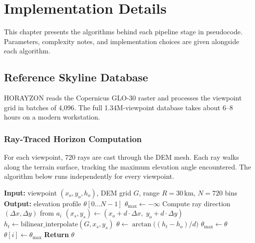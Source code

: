 \chapter{Implementation Details}
\label{chap:implementation}

This chapter presents the algorithms behind each pipeline stage in pseudocode. Parameters, complexity notes, and implementation choices are given alongside each algorithm.

\section{Reference Skyline Database}

HORAYZON reads the Copernicus GLO-30 raster and processes the viewpoint grid in batches of 4{,}096. The full 1.34M-viewpoint database takes about 6--8 hours on a modern workstation.

\subsection{Ray-Traced Horizon Computation}

For each viewpoint, 720 rays are cast through the DEM mesh. Each ray walks along the terrain surface, tracking the maximum elevation angle encountered. The algorithm below runs independently for every viewpoint.

\begin{algorithm}[H]
\caption{Ray-Traced Horizon}
\label{alg:raytrace}
\begin{algorithmic}[1]
\State \textbf{Input:} viewpoint $(x_o, y_o, h_o)$, DEM grid $G$, range $R = 30$\,km, $N = 720$ bins
\State \textbf{Output:} elevation profile $\theta[0 \ldots N{-}1]$
    \State $\theta_{\max} \leftarrow -\infty$
    \State Compute ray direction $(\Delta x, \Delta y)$ from $a_i$
        \State $(x_s, y_s) \leftarrow (x_o + d \cdot \Delta x,\; y_o + d \cdot \Delta y)$
        \State $h_t \leftarrow \text{bilinear\_interpolate}(G, x_s, y_s)$
        \State $\theta \leftarrow \arctan\!\big((h_t - h_o) / d\big)$
        \If{$\theta > \theta_{\max}$}
            \State $\theta_{\max} \leftarrow \theta$
        \EndIf
    \EndFor
    \State $\theta[i] \leftarrow \theta_{\max}$
\EndFor
\State \textbf{Return} $\theta$
\end{algorithmic}
\end{algorithm}


